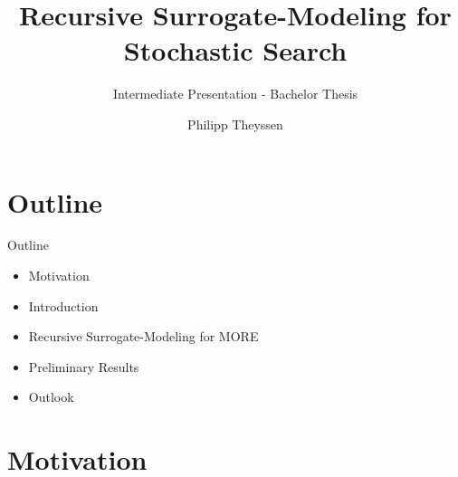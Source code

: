 \documentclass[navbarinfooter, 12pt]{sdqbeamer}
\title[Short Title]{Recursive Surrogate-Modeling for Stochastic Search}
\subtitle{Intermediate Presentation - Bachelor Thesis}
\author{Philipp Theyssen}
\begin{document}
\KITtitleframe
\section{Outline}
\begin{frame}{Outline}
 \begin{itemize}
  \item Motivation
  \item Introduction
  \item Recursive Surrogate-Modeling for MORE
  \item Preliminary Results
  \item Outlook
  \end{itemize}
\end{frame}



\section{Motivation}
\end{document}
